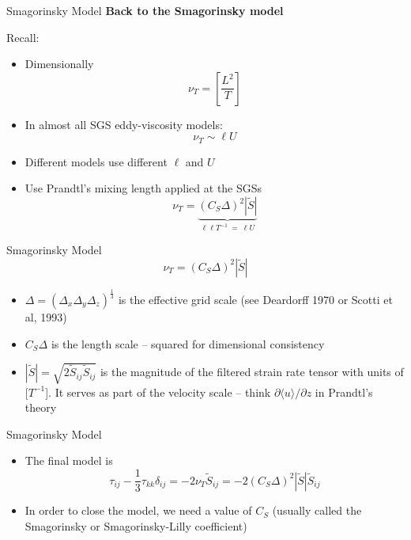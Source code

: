 \begin{frame}{Smagorinsky Model}
\textbf{Back to the Smagorinsky model}

Recall:
\begin{itemize}
	\item Dimensionally
	$$\nu_T = \left[ \frac{L^2}{T}\right]$$
	\item In almost all SGS eddy-viscosity models:
	$$\nu_T \sim \ell U$$
	\item Different models use different $\ell$ and $U$
\end{itemize}

\begin{itemize}
	\item Use Prandtl's mixing length applied at the SGSs
	$$\nu_T = \underbrace{(C_S \Delta)^2 | \widetilde{S}|}_{\ell \ell T^{-1}\ =\ \ell U}$$
\end{itemize}

\end{frame}

\begin{frame}{Smagorinsky Model}
$$\nu_T = (C_S \Delta)^2 | \widetilde{S}|$$

\begin{itemize}
	\item $\Delta = (\Delta_x \Delta_y \Delta_z)^{\frac{1}{3}}$ is the effective grid scale (see Deardorff 1970 or Scotti et al, 1993)
	\item $C_S \Delta$ is the length scale -- squared for dimensional consistency
	\item $|\widetilde{S}| = \sqrt{2\widetilde{S}_{ij}\widetilde{S}_{ij}}$ is the magnitude of the filtered strain rate tensor with units of [$T^{-1}$]. It serves as part of the velocity scale -- think $\partial \langle u \rangle / \partial z$ in Prandtl's theory
\end{itemize}

\end{frame}

\begin{frame}{Smagorinsky Model}

\begin{itemize}
	\item The final model is 
	$$\tau_{ij} - \frac{1}{3}\tau_{kk}\delta_{ij} = -2\nu_{T} \widetilde{S}_{ij} = -2 (C_S \Delta)^2 | \widetilde{S}| \widetilde{S}_{ij}$$
	\item In order to close the model, we need a value of $C_S$ (usually called the Smagorinsky or Smagorinsky-Lilly coefficient)
\end{itemize}

\end{frame}

